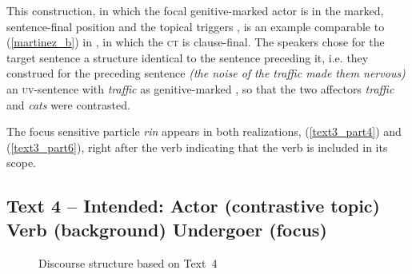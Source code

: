 \documentclass[output=paper,
,modfonts
,nonflat]{langsci/langscibook}
\begin{document}
\noindent This construction, in which the focal genitive-marked actor is in the marked, sentence-final position and the topical  triggers , is an example comparable to (\ref{martinez_b}) in , in which the \textsc{ct} is clause-final. The speakers chose for the target sentence a structure identical to the sentence preceding it, i.e. they construed for the preceding sentence \textit{(the noise of the traffic made them nervous)} an \textsc{uv}-sentence with \textit{traffic} as genitive-marked , so that the two affectors \textit{traffic} and \textit{cats} were contrasted. 

The focus sensitive particle \textit{rin} appears in both realizations, (\ref{text3_part4}) and (\ref{text3_part6}), right after the verb indicating that the verb is included in its scope. 
    
\subsection{Text 4 -- Intended: Actor (contrastive topic) Verb (background) Undergoer (focus)}\label{sect:ct_bg_f}

\begin{figure}
\caption{Discourse structure based on Text~4}
\label{fig:text4_analysis1}
\end{figure}
\end{document}
